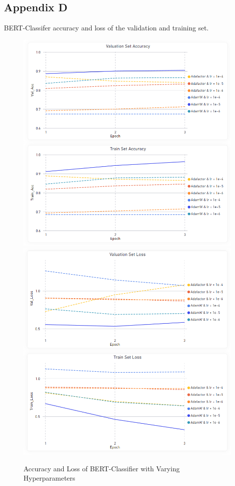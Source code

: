 \documentclass[11pt, a4paper]{article}
\begin{document}
\pagebreak
\subsection{Appendix D}
BERT-Classifer accuracy and loss of the validation and training set.
\label{appendix:BERT_Sentiment_Classifier}
\begin{figure}[!htb]
    \centering
    \includegraphics[scale=0.43]{BERT_Accuracy.png}
    \includegraphics[scale=0.43]{BERT_Loss.png}
    \caption{Accuracy and Loss of BERT-Classifier with Varying Hyperparameters}
    \label{fig:bert_acc_loss}
\end{figure}
\end{document}
